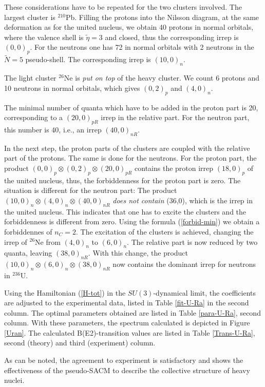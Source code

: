 \documentclass[12pt]{article}
\begin{document}
These considerations have to be repeated for the two clusters involved. The largest cluster is
$^{210}$Pb. Filling the protons into the Nilsson diagram, at the same deformation as for the
united nucleus, we obtain 40 protons in normal orbitals, where the valence shell is
${\widetilde \eta}=3$ and closed, thus the corresponding irrep is $(0,0)_{p}$. For the neutrons one has
72 in normal orbitals with 2 neutrons in the ${\widetilde N}=5$ pseudo-shell. The corresponding
irrep is $(10,0)_{n}$.

The light cluster $^{26}$Ne is {\it put on top} of the heavy cluster. We count 6 protons and 10 neutrons
in normal orbitals, which gives $(0,2)_{p}$ and $(4,0)_{n}$.

The minimal number of quanta which have to be added in the proton part is 20, corresponding 
to a $(20,0)_{p R}$ 
irrep in the relative part. For the neutron part, this number is 40, i.e.,
an irrep $(40,0)_{n R}$.

In the next step, the proton parts of the clusters are coupled with the relative part of the protons. The same is done for the neutrons. For the proton part, the product
$(0,0)_p \otimes (0,2)_p \otimes (20,0)_{p R}$ contains the proton irrep $(18,0)_p$
of the united nucleus, thus, the forbiddenness for the proton part is zero. 
The situation is different for the neutron part: The product 
$(10,0)_n \otimes (4,0)_n \otimes (40,0)_{n R}$
{\it does not contain} (36,0), which is the irrep in the united nucleus.
This indicates that one has to excite the clusters and the forbiddenness is different from zero.
Using the formula (\ref{forbid-min}) we obtain a forbiddennes of $n_C=2$. The excitation of the clusters
is achieved, changing the irrep of $^{26}$Ne from $(4,0)_n$ to $(6,0)_n$. 
The relative part is now reduced by two 
quanta, leaving $(38,0)_{nR}$. With this change, the product
$(10,0)_n \otimes (6,0)_n \otimes (38,0)_{n R}$ 
now contains the dominant irrep for neutrons in $^{236}$U.

Using the Hamiltonian (\ref{H-tot}) in the $SU(3)$-dynamical limit, the coefficients are adjusted to 
the experimental data, listed in Table \ref{fit-U-Ra} in the second column. 
The optimal parameters obtained are listed in
Table \ref{para-U-Ra}, second column. 
With these parameters, the spectrum calculated is depicted in Figure \ref{Uran}.
The calculated B(E2)-transition values are listed in Table \ref{Trans-U-Ra}, second (theory)
and third (experiment) column. 

As can be noted, the agreement to experiment is satisfactory and shows the effectiveness of the
pseudo-SACM to describe the collective structure of heavy nuclei.
\end{document}
